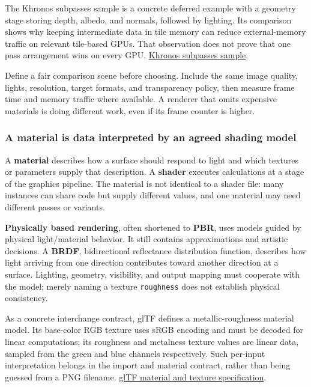 The Khronos subpasses sample is a concrete deferred example with a geometry stage storing depth, albedo, and normals, followed by lighting. Its comparison shows why keeping intermediate data in tile memory can reduce external-memory traffic on relevant tile-based GPUs. That observation does not prove that one pass arrangement wins on every GPU. \href{https://docs.vulkan.org/samples/latest/samples/performance/subpasses/README.html}{Khronos subpasses sample}.

Define a fair comparison scene before choosing. Include the same image quality, lights, resolution, target formats, and transparency policy, then measure frame time and memory traffic where available. A renderer that omits expensive materials is doing different work, even if its frame counter is higher.

\subsubsection{A material is data interpreted by an agreed shading model}\label{06-engine-ii-ch026-a-material-is-data-interpreted-by-an-agreed-shading-model}

A \textbf{material} describes how a surface should respond to light and which textures or parameters supply that description. A \textbf{shader} executes calculations at a stage of the graphics pipeline. The material is not identical to a shader file: many instances can share code but supply different values, and one material may need different passes or variants.

\textbf{Physically based rendering}, often shortened to \textbf{PBR}, uses models guided by physical light/material behavior. It still contains approximations and artistic decisions. A \textbf{BRDF}, bidirectional reflectance distribution function, describes how light arriving from one direction contributes toward another direction at a surface. Lighting, geometry, visibility, and output mapping must cooperate with the model; merely naming a texture \texttt{roughness} does not establish physical consistency.

As a concrete interchange contract, glTF defines a metallic-roughness material model. Its base-color RGB texture uses sRGB encoding and must be decoded for linear computations; its roughness and metalness texture values are linear data, sampled from the green and blue channels respectively. Such per-input interpretation belongs in the import and material contract, rather than being guessed from a PNG filename. \href{https://registry.khronos.org/glTF/specs/2.0/glTF-2.0.html\#materials}{glTF material and texture specification}.

